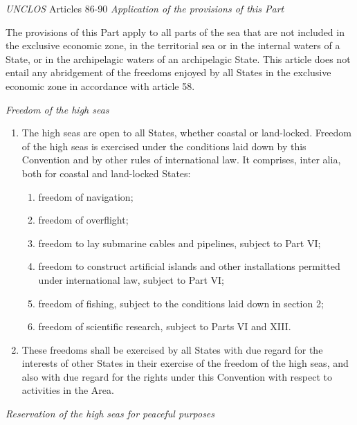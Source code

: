 \begin{conventiondetails}{\textit{UNCLOS} Articles 86-90}
    \flushleft
    \textit{Application of the provisions of this Part}

    \vspace{\baselineskip}

    The provisions of this Part apply to all parts of the sea that are not included in the exclusive economic zone, in the territorial sea or in the internal waters of a State, or in the archipelagic waters of an archipelagic State. This article does not entail any abridgement of the freedoms enjoyed by all States in the exclusive economic zone in accordance with article 58.

    \textit{Freedom of the high seas}
    \begin{enumerate}
        \item The high seas are open to all States, whether coastal or land-locked. Freedom of the high seas is exercised under the conditions laid down by this Convention and by other rules of international law. It comprises, inter alia, both for coastal and land-locked States:
        \begin{enumerate}[label=(\alph*)]
            \item freedom of navigation;
            \item freedom of overflight;
            \item freedom to lay submarine cables and pipelines, subject to Part VI;
            \item freedom to construct artificial islands and other installations permitted under international law, subject to Part VI;
            \item freedom of fishing, subject to the conditions laid down in section 2;
            \item freedom of scientific research, subject to Parts VI and XIII.
        \end{enumerate}
        \item These freedoms shall be exercised by all States with due regard for the interests of other States in their exercise of the freedom of the high seas, and also with due regard for the rights under this Convention with respect to activities in the Area.
    \end{enumerate}

    \textit{Reservation of the high seas for peaceful purposes}


\end{conventiondetails}
